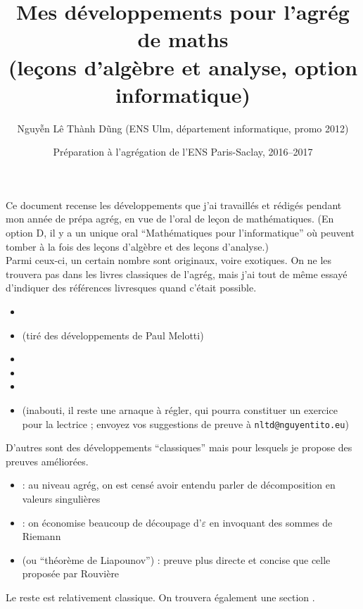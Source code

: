 \documentclass[a4paper, 11pt]{article}
\begin{document}
\title{Mes développements pour l'agrég de maths\\
  (leçons d'algèbre et analyse, option informatique)}
\author{Nguyễn Lê Thành Dũng (ENS Ulm, département informatique, promo 2012)}
\date{Préparation à l'agrégation de l'ENS Paris-Saclay, 2016--2017}
\maketitle

Ce document recense les développements que j'ai travaillés et rédigés pendant mon
année de prépa agrég, en vue de l'oral de leçon de mathématiques. (En option D,
il y a un unique oral \enquote{Mathématiques pour l'informatique} où peuvent
tomber à la fois des leçons d'algèbre et des leçons d'analyse.)\\

Parmi ceux-ci, un certain nombre sont originaux, voire exotiques. On ne les
trouvera pas dans les livres classiques de l'agrég, mais j'ai tout de même
essayé d'indiquer des références livresques quand c'était possible.
\begin{itemize}
\item {}
\item {} (tiré des développements de Paul Melotti)
\item {}
\item {}
\item {}
\item {} (inabouti, il reste une arnaque à régler, qui pourra
  constituer un exercice pour la lectrice ; envoyez vos suggestions de preuve à
  \texttt{nltd@nguyentito.eu})
\end{itemize}
D'autres sont des développements \enquote{classiques} mais pour lesquels je
propose des preuves améliorées.
\begin{itemize}
\item {} : au niveau agrég, on est censé avoir entendu parler
  de décomposition en valeurs singulières
\item {} : on économise beaucoup de découpage d'$\varepsilon$ en
  invoquant des sommes de Riemann
\item {} (ou \enquote{théorème de Liapounov}) : preuve plus
  directe et concise que celle proposée par Rouvière
\end{itemize}
Le reste est relativement classique.
On trouvera également une section .\\
\end{document}

